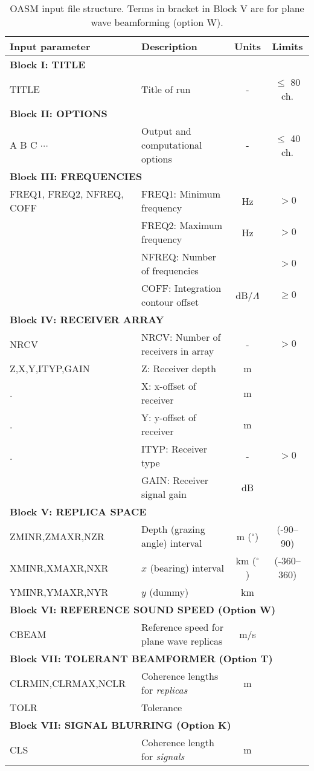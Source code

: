 \begin{table}
\begin{center}
\small
\begin{tabular}{|l|l|c|c|}
\hline \hline
Input parameter & Description & Units & Limits \\
\hline \hline
\multicolumn{4}{|l|}{\bf Block I: TITLE}  \\ \hline
TITLE & Title of run  & - & $\leq$ 80 ch. \\
\hline
\multicolumn{4}{|l|}{\bf Block II: OPTIONS}  \\ \hline
A B C $\cdots$ & Output and computational options & - & $\leq$ 40 ch. \\
\hline
\multicolumn{4}{|l|}{\bf Block III: FREQUENCIES}  \\ \hline
FREQ1, FREQ2, NFREQ, COFF & FREQ1: Minimum frequency & Hz & $>0$ \\
 	& FREQ2: Maximum frequency & Hz & $>0$ \\
        & NFREQ: Number of frequencies & & $>0$ \\
 	& COFF: Integration contour offset & dB/$\Lambda$ & $\geq 0$ \\
\hline
\multicolumn{4}{|l|}{\bf Block IV: RECEIVER ARRAY}  \\ \hline
NRCV & NRCV: Number of receivers in array & - & $>0$ \\
Z,X,Y,ITYP,GAIN & Z: Receiver depth & m & \\
.	& X: x-offset of receiver & m & \\ 
.	& Y: y-offset of receiver & m & \\
.	& ITYP: Receiver type  & - & $>0$ \\
	& GAIN: Receiver signal gain & dB & \\ 
\hline
\multicolumn{4}{|l|}{\bf Block V: REPLICA SPACE}  \\ \hline
ZMINR,ZMAXR,NZR & Depth (grazing angle) interval& m ($^{\circ}$) & (-90--90)\\ 
XMINR,XMAXR,NXR & $x$ (bearing) interval & km ($^{\circ}$) & (-360--360)\\ 
YMINR,YMAXR,NYR & $y$ (dummy)  & km & \\ 
\hline
\multicolumn{4}{|l|}{\bf Block VI: REFERENCE SOUND SPEED (Option W)}  \\ \hline
CBEAM & Reference speed for plane wave replicas & m/s & \\ 
\hline
\multicolumn{4}{|l|}{\bf Block VII: TOLERANT BEAMFORMER (Option T)} \\ \hline
CLRMIN,CLRMAX,NCLR & Coherence lengths for {\em replicas} & m & \\ 
TOLR & Tolerance &  & \\ 
\hline
\multicolumn{4}{|l|}{\bf Block VII: SIGNAL BLURRING (Option K)} \\ \hline
CLS & Coherence length for {\em signals} & m & \\ 
\hline
\end{tabular}
\end{center}
\caption{OASM input file structure. Terms in bracket in Block V are for
plane wave beamforming (option W).
 \label{tab:OASMI} }
\end{table} 

